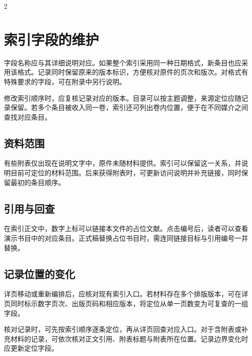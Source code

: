 \documentclass[UTF8,fontset=none,scheme=plain]{ctexart}
\begin{document}
\begin{multicols}{2}
\section*{索引字段的维护}
字段名称应与其详细说明对应。如果整个索引采用同一种日期格式，新条目也应采用该格式。记录同时保留原来的版本标识，方便核对原件的页次和版次。对格式有特殊要求的字段，可在附录中另行说明。

修改索引顺序时，应复核记录对应的版本。目录可以按主题调整，来源定位应随记录保留。若多个条目被收入同一卷，索引还可列出卷内位置，便于在不同媒介之间查找对应条目。

\subsection*{资料范围}
有些附表仅出现在说明文字中，原件未随材料提供。索引可以保留这一关系，并说明目前可定位的材料范围。后来获得附表时，可更新访问说明并补充链接，同时保留最初的条目顺序。

\subsection*{引用与回查}
在索引正文中，数字上标可以链接本文件的占位文献。点击编号后，读者可以查看演示书目中的对应条目。正式稿替换占位书目时，需连同链接目标与引用编号一并替换。

\subsection*{记录位置的变化}
详页移动或重新编排后，应核对现有索引入口。若材料存在多个排版版本，可在详页同时标示数字页次、出版页码和相应版本，将定位从单一页数变为可复查的一组字段。

核对记录时，可先按索引顺序逐条定位，再从详页回查对应入口。对于含附表或补充材料的记录，可依次核对正文引用、附表标题与附表所在位置。记录边界变化时应更新定位字段。
\end{multicols}

\clearpage\thispagestyle{letterreport}
\end{document}
